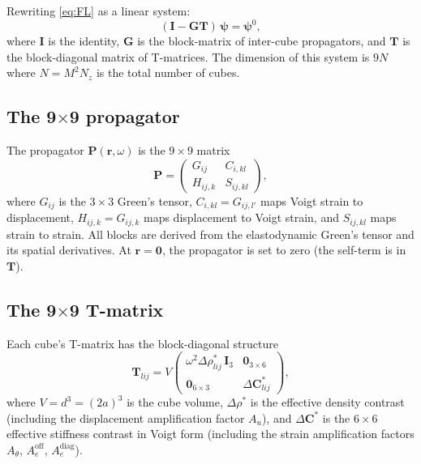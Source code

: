 \documentclass[11pt,a4paper]{article}
\newcommand{\D}{\Delta}
\newcommand{\bG}{\bm{G}}
\newcommand{\bT}{\bm{T}}
\newcommand{\bI}{\bm{I}}
\newcommand{\bC}{\bm{C}}
\newcommand{\bP}{\bm{P}}
\begin{document}
Rewriting \eqref{eq:FL} as a linear system:
\begin{equation}\label{eq:system}
  \boxed{(\bI - \bG \bT)\,\bm{\psi} = \bm{\psi}^0,}
\end{equation}
where $\bI$ is the identity, $\bG$ is the block-matrix of
inter-cube propagators, and $\bT$ is the block-diagonal matrix
of T-matrices.  The dimension of this system is $9 N$ where
$N = M^2 N_z$ is the total number of cubes.

\subsection{The 9$\times$9 propagator}

The propagator $\bP(\bm{r}, \omega)$ is the $9 \times 9$ matrix
\begin{equation}\label{eq:propagator}
  \bP = \begin{pmatrix}
    G_{ij} & C_{i,kl} \\
    H_{ij,k} & S_{ij,kl}
  \end{pmatrix},
\end{equation}
where $G_{ij}$ is the $3 \times 3$ Green's tensor,
$C_{i,kl} = G_{ij,l'}$ maps Voigt strain to displacement,
$H_{ij,k} = G_{ij,k}$ maps displacement to Voigt strain, and
$S_{ij,kl}$ maps strain to strain.  All blocks are derived
from the elastodynamic Green's tensor and its spatial derivatives.
At $\bm{r} = \bm{0}$, the propagator is set to zero (the self-term
is in~$\bT$).

\subsection{The 9$\times$9 T-matrix}

Each cube's T-matrix has the block-diagonal structure
\begin{equation}\label{eq:Tmatrix}
  \bT_{lij} = V \begin{pmatrix}
    \omega^2 \D\rho^*_{lij}\,\bI_3 & \bm{0}_{3 \times 6} \\
    \bm{0}_{6 \times 3} & \D\bC^*_{lij}
  \end{pmatrix},
\end{equation}
where $V = d^3 = (2a)^3$ is the cube volume,
$\D\rho^*$ is the effective density contrast (including the
displacement amplification factor $A_u$), and
$\D\bC^*$ is the $6 \times 6$ effective stiffness contrast in
Voigt form (including the strain amplification factors
$A_\theta$, $A_e^{\text{off}}$, $A_e^{\text{diag}}$).
\end{document}
